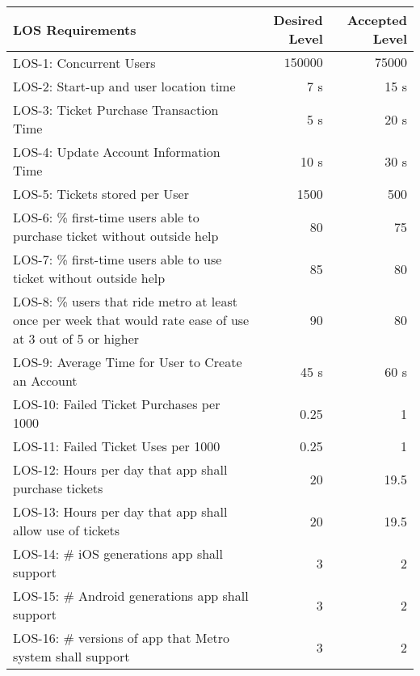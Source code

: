 \begin{table}[h]
    \begin{tabularx}{\textwidth}{Xrr}
    \hline
    LOS Requirements                                                                                          									& Desired Level & Accepted Level \\ \hline
    LOS-1: Concurrent Users														& $150000$		& $75000$           \\
    LOS-2: Start-up and user location time 										& 7 s  			& 15 s           \\
    LOS-3: Ticket Purchase Transaction Time										& 5 s 			& 20 s            \\
    LOS-4: Update Account Information Time										& 10 s 			& 30 s            \\
    LOS-5: Tickets stored per User												& 1500 			& 500            \\
    LOS-6: \% first-time users able to purchase ticket without outside help		& 80  			& 75             \\
    LOS-7: \% first-time users able to use ticket without outside help			& 85 			& 80             \\
    LOS-8: \% users that ride metro at least once per week that would rate 
    ease of use at 3 out of 5 or higher											& 90  			& 80             \\
    LOS-9: Average Time for User to Create an Account							& 45 s			& 60 s            \\
    LOS-10: Failed Ticket Purchases per 1000 									& 0.25  		& 1              \\
    LOS-11: Failed Ticket Uses per 1000  										& 0.25  		& 1              \\
    LOS-12: Hours per day that app shall purchase tickets 						& 20  			& 19.5             \\
    LOS-13: Hours per day that app shall allow use of tickets   				& 20 			& 19.5             \\
    LOS-14: \# iOS generations app shall support 								& 3  			& 2              \\
    LOS-15: \# Android generations app shall support   							& 3  			& 2              \\
    LOS-16: \# versions of app that Metro system shall support  				& 3    			& 2              \\
    \hline
    \end{tabularx}
\end{table}